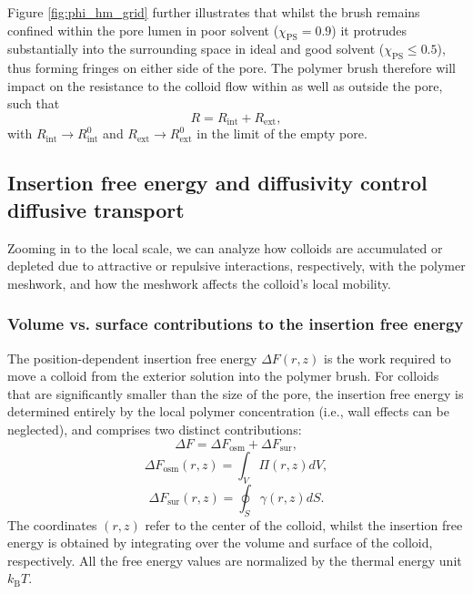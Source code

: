 \documentclass[12pt, a4paper]{article}
\begin{document}
Figure \ref{fig:phi_hm_grid} further illustrates that whilst the brush remains confined within the pore lumen in poor solvent ($\chi_{\text{PS}}=0.9$) it protrudes substantially into the surrounding space in ideal and good solvent ($\chi_{\text{PS}}\le0.5$), thus forming fringes on either side of the pore.
The polymer brush therefore will impact on the resistance to the colloid flow within as well as outside the pore, such that
\begin{equation}
    R=R_{\text{int}}+R_{\text{ext}},
    \label{eq:R_tot_tot}
\end{equation}
with $R_{\text{int}}\rightarrow R_{\text{int}}^{0}$ and $R_{\text{ext}}\rightarrow R_{\text{ext}}^{0}$ in the limit of the empty pore.


\subsection{Insertion free energy and diffusivity control diffusive transport}

Zooming in to the local scale, we can analyze how colloids are accumulated or depleted due to attractive or repulsive interactions, respectively, with the polymer meshwork, and how the meshwork affects the colloid's local mobility.


\subsubsection{Volume vs. surface contributions to the insertion free energy}

The position-dependent insertion free energy $\Delta F(r,z)$ is the work required to move a colloid from the exterior solution into the polymer brush.
For colloids that are significantly smaller than the size of the pore, the insertion free energy is determined entirely by the local polymer concentration (i.e., wall effects can be neglected), and comprises two distinct contributions:
\begin{equation}
    \Delta F = \Delta F_{\text{osm}} + \Delta F_{\text{sur}},
    \label{eq:Delta_F}
\end{equation}
$$
\Delta F_{\text{osm}}(r,z) = \int_{V} \Pi(r,z) dV,
$$
$$
\Delta F_{\text{sur}}(r,z) = \oint_{S} \gamma (r,z) dS.
$$
The coordinates $(r,z)$ refer to the center of the colloid, whilst the insertion free energy is obtained by integrating over the volume and surface of the colloid, respectively. All the free energy values are normalized by the thermal energy unit $k_{\text{B}}T$.
\end{document}
